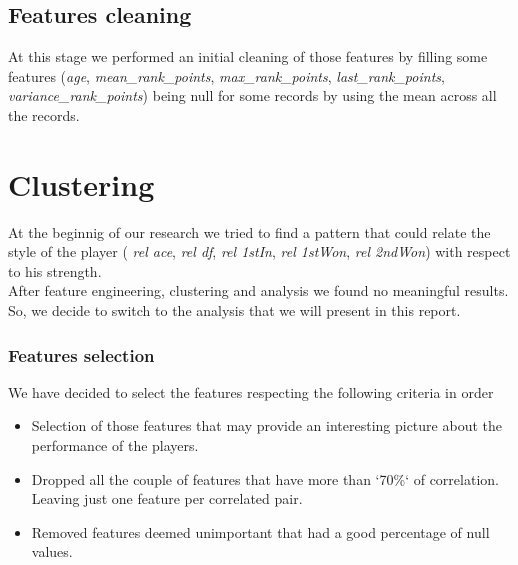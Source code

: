 \documentclass{article}
\begin{document}
\subsection{Features cleaning}
At this stage we performed an initial cleaning of those features by filling some features (\textit{age},  \textit{mean\_rank\_points},  \textit{max\_rank\_points},  \textit{last\_rank\_points},  \textit{variance\_rank\_points}) being null for some records by using the mean across all the records.

\newpage
\section{Clustering}
At the beginnig of our research we tried to find a pattern that could relate the style of the player ( \textit{rel ace},  \textit{rel df},  \textit{rel 1stIn},  \textit{rel 1stWon},  \textit{rel 2ndWon}) with respect to his strength.\\ After feature engineering, clustering and analysis we found no meaningful results. So, we decide to switch to the analysis that we will present in this report.

\subsubsection{Features selection}
We have decided to select the features respecting the following criteria in order
\begin{itemize}
    \item Selection of those features that may provide an interesting picture about the performance of the players.
    \item Dropped all the couple of features that have more than `70\%` of correlation. Leaving just one feature per correlated pair.
    \item Removed features deemed unimportant that had a good percentage of null values.
\end{itemize}
\end{document}

